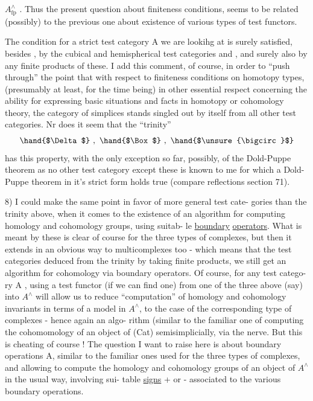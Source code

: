 
$A^{\wedge}_{\mathrm{fp}}$ . Thus the present question about finiteness conditions, seems
to be related (possibly) to the previous one about existence of various
types of test functors.

The condition for a strict test category A we are lookihg at is
surely satisfied, besides \hand{$\Delta$}, by the cubical and hemispherical test
categories \hand{$\Box$} and \hand{$\unsure{\bigcirc}$}, and surely also by any finite products of these.
I add this comment, of course, in order to ``push through'' the point
that  with respect to finiteness conditions on homotopy types, 
(presumably at least, for the time being) in  other essential respect
concerning the ability  for expressing basic situations and facts in
homotopy or cohomology theory, the category of simplices stands singled
out by itself from all other test categories. Nr does it seem that
the ``trinity''
\[ \hand{$\Delta$}\ ,\ \hand{$\Box$}\ ,\ \hand{$\unsure{\bigcirc}$} \]
has this property, with the only exception so far, possibly, of the
Dold-Puppe theorem\hand{(} as no other test category except these is known to
me for which a Dold-Puppe theorem in it's strict form holds true
(compare reflections section 71)\hand{)}.

8) I could make the same point in favor of more general test cate-%
gories than the trinity above, when it comes to the existence of an
algorithm for computing homology and cohomology groups, using suitab-%
le \uline{boundary} \uline{operators}. What is meant by these is clear of course for
the three types of complexes, but then it extends in an obvious way to
multicomplexes too - which means that  the test categories deduced
from the trinity by taking finite products, we still get an algorithm
for cohomology via boundary operators. Of course, for any test catego-%
ry A , using a test functor (if we can find one) from one of the
three above (say) into $A^{\wedge}$ will allow us to reduce ``computation'' of
homology and cohomology invariants in terms of a model in $A^{\wedge}$, to the
case of the corresponding type of complexes - hence again an algo-%
rithm (similar to the familiar one of computing the cohomomology of an
object of (Cat)  semisimplicially, via the nerve\hand{)}. But this is
cheating of course ! The question I want to raise here is about
 boundary operations  A, similar to the familiar ones used for
the three  types of complexes, and allowing to compute the homology and
cohomology groups of an object of $A^{\wedge}$ in the usual way, involving sui-%
table \uline{signs} + or - associated to the various boundary operations.

